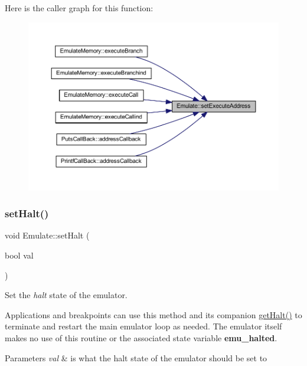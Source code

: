 Here is the caller graph for this function\+:
\nopagebreak
\begin{figure}[H]
\begin{center}
\leavevmode
\includegraphics[width=350pt]{class_emulate_aff5f9779fdad54f853d4e799f5289410_icgraph}
\end{center}
\end{figure}
\mbox{\label{class_emulate_a4858bc80cf7b078a592f9c8d3442450d}} 
\subsubsection{\texorpdfstring{setHalt()}{setHalt()}}
{\footnotesize\ttfamily void Emulate\+::set\+Halt (\begin{DoxyParamCaption}\item[{bool}]{val }\end{DoxyParamCaption})\hspace{0.3cm}{\ttfamily [inline]}}



Set the {\itshape halt} state of the emulator. 

Applications and breakpoints can use this method and its companion \mbox{\hyperlink{class_emulate_ab1f2882dd3554c18c60e817e80f3c4bc}{get\+Halt()}} to terminate and restart the main emulator loop as needed. The emulator itself makes no use of this routine or the associated state variable {\bfseries{emu\+\_\+halted}}. 
\begin{DoxyParams}{Parameters}
{\em val} & is what the halt state of the emulator should be set to \\
\hline
\end{DoxyParams}


